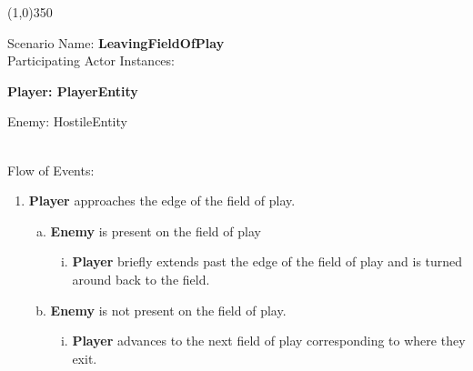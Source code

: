 \documentclass[12pt]{article}       %
\begin{document}
\begin{center} \line(1,0){350} \end{center}
Scenario Name: {\bf LeavingFieldOfPlay} \\
Participating Actor Instances:        \hspace{46pt} {\bf Player: PlayerEntity

					          \hspace{2.6 in}   Enemy: HostileEntity}  \vspace{10pt}  \\ 
Flow of Events: 
\begin{enumerate} 
\item {\bf Player} approaches the edge of the field of play.
      \begin{enumerate}[a.]
       \item {\bf Enemy} is present on the field of play
                \begin{enumerate}[i.]
                \item {\bf Player} briefly extends past the edge of the field of play and is turned around back to the field.
                \end{enumerate}
       \item {\bf Enemy} is not present on the field of play.
                \begin{enumerate}[i.]
                \item {\bf Player} advances to the next field of play corresponding to where they exit.
                \end{enumerate}
        \end{enumerate}
\end{enumerate}
\end{document}
